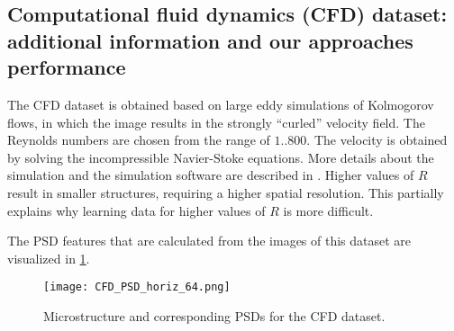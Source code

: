 \documentclass[11pt, authoryear]{elsarticle}
\renewcommand\textcolor[2]{#2}
\begin{document}
\begin{appendix}
		\section{Computational fluid dynamics (CFD) dataset: additional information and our approaches performance}
		\label{appendix:CFD_PSD}
		\textcolor{red}{
			The CFD dataset is obtained based on large eddy simulations of Kolmogorov flows, in which the image results in the strongly ``curled'' velocity field. The Reynolds numbers are chosen from the range of $1..800$. The velocity is obtained by solving the incompressible Navier-Stoke equations. More details about the simulation and the simulation software are described in \citep{kochkov2021machine}.
			Higher values of $R$ result in smaller structures, requiring a higher spatial resolution. This partially explains why learning data for higher values of $R$ is more difficult.
		}
		\textcolor{red}{
			The \gls{PSD} features that are calculated from the images of this dataset are visualized in \cref{fig:CFD_PSD_horiz_64}.
		}
		\begin{figure}
			\centering
			\texttt{[image: CFD\_PSD\_horiz\_64.png]}
			\caption[]{Microstructure and corresponding \glspl{PSD} for the
				CFD dataset.}	
			\label{fig:CFD_PSD_horiz_64}
		\end{figure}
		

\end{appendix}
\end{document}
